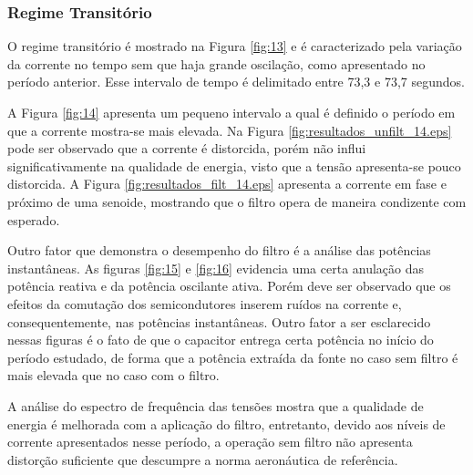 \FloatBarrier

\subsubsection{Regime Transitório}

O regime transitório é mostrado na Figura \ref{fig:13} e é caracterizado pela variação da corrente no tempo sem que haja grande oscilação, como apresentado no período anterior. Esse intervalo de tempo é delimitado entre 73,3 e 73,7 segundos.

A Figura \ref{fig:14} apresenta um pequeno intervalo a qual é definido o período em que a corrente mostra-se mais elevada. Na Figura \ref{fig:resultados_unfilt_14.eps} pode ser observado que a corrente é distorcida, porém não influi significativamente na qualidade de energia, visto que a tensão apresenta-se pouco distorcida. A Figura \ref{fig:resultados_filt_14.eps} apresenta a corrente em fase e próximo de uma senoide, mostrando que o filtro opera de maneira condizente com esperado. 

Outro fator que demonstra o desempenho do filtro é a análise das potências instantâneas. As figuras \ref{fig:15} e \ref{fig:16} evidencia uma certa anulação das potência reativa e da potência oscilante ativa. Porém deve ser observado que os efeitos da comutação dos semicondutores inserem ruídos na corrente e, consequentemente, nas potências instantâneas. Outro fator a ser esclarecido nessas figuras é o fato de que o capacitor entrega certa potência no início do período estudado, de forma que a potência extraída da fonte no caso sem filtro é mais elevada que no caso com o filtro.

A análise do espectro de frequência das tensões mostra que a qualidade de energia é melhorada com a aplicação do filtro, entretanto, devido aos níveis de corrente apresentados nesse período, a operação sem filtro não apresenta distorção suficiente que descumpre a norma aeronáutica de referência.

